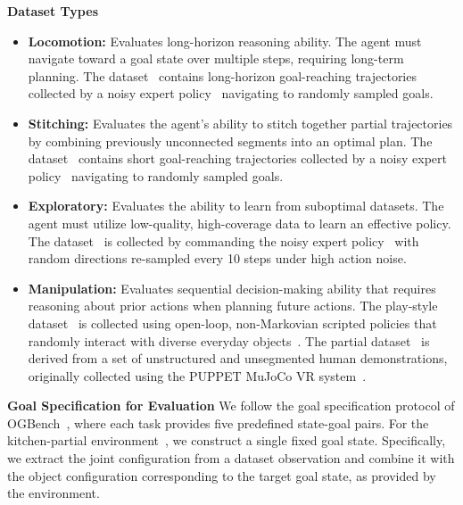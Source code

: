 \documentclass{article}
\begin{document}
\vspace{0.5em}

\noindent\textbf{Dataset Types}
\begin{itemize}[leftmargin=1.0em, itemsep=0.5em, topsep=1.5pt]
  \item \textbf{Locomotion:} Evaluates long-horizon reasoning ability. The agent must navigate toward a goal state over multiple steps, requiring long-term planning. The dataset~\cite{park2025ogbench} contains long-horizon goal-reaching trajectories collected by a noisy expert policy~\cite{haarnoja2018sac} navigating to randomly sampled goals.
  \item \textbf{Stitching:} Evaluates the agent’s ability to stitch together partial trajectories by combining previously unconnected segments into an optimal plan. The dataset~\cite{park2025ogbench} contains short goal-reaching trajectories collected by a noisy expert policy~\cite{haarnoja2018sac} navigating to randomly sampled goals.
  \item \textbf{Exploratory:} Evaluates the ability to learn from suboptimal datasets. The agent must utilize low-quality, high-coverage data to learn an effective policy. The dataset~\cite{park2025ogbench} is collected by commanding the noisy expert policy~\cite{haarnoja2018sac} with random directions re-sampled every 10 steps under high action noise.
  \item \textbf{Manipulation:} Evaluates sequential decision-making ability that requires reasoning about prior actions when planning future actions. The play-style dataset~\cite{lynch2019learning} is collected using open-loop, non-Markovian scripted policies that randomly interact with  diverse everyday objects~\cite{park2025ogbench}. The partial dataset~\cite{fu2020d4rl} is derived from a set of unstructured and unsegmented human demonstrations, originally collected using the PUPPET MuJoCo VR system~\cite{kumar2015mujoco, gupta2020relay}.
\end{itemize}

\vspace{0.5em}

\textbf{Goal Specification for Evaluation}
We follow the goal specification protocol of OGBench~\cite{park2025ogbench}, where each task provides five predefined state-goal pairs. For the kitchen-partial environment~\cite{fu2020d4rl, gupta2020relay}, we construct a single fixed goal state. Specifically, we extract the joint configuration from a dataset observation and combine it with the object configuration corresponding to the target goal state, as provided by the environment.  
\end{document}
